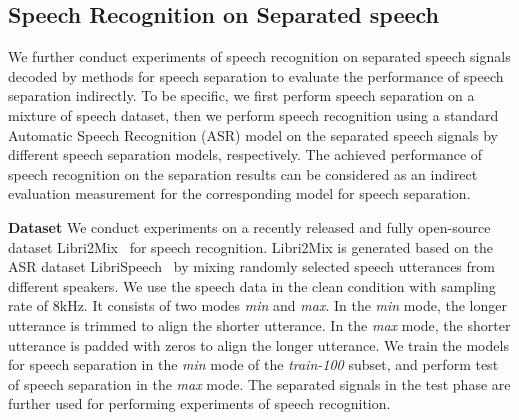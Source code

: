 \begin{table}[t]
  \centering
  \caption{Performance of speech recognition as well as speech separation on Libri2Mix dataset.}
  \label{tab:comparison_libri}
\renewcommand{\arraystretch}{1.4}
\end{table}

\subsection{Speech Recognition on Separated speech}

We further conduct experiments of speech recognition on separated speech signals decoded by methods for speech separation to evaluate the performance of speech separation indirectly.  To be specific, we first perform speech separation on a mixture of speech dataset, then we perform speech recognition using a standard Automatic Speech Recognition (ASR) model on the separated speech signals by different speech separation models, respectively. The achieved performance of speech recognition on the separation results can be considered as an indirect evaluation measurement for the corresponding model for speech separation.

\noindent\textbf{Dataset} 
We conduct experiments on a recently released and fully open-source dataset Libri2Mix~\cite{librimix} for speech recognition. Libri2Mix is generated based on the ASR dataset LibriSpeech~\cite{librispeech} by mixing randomly selected speech utterances from different speakers. 
We use the speech data in the clean condition with sampling rate of 8kHz. It consists of two modes \textit{min} and \textit{max}. In the \textit{min} mode, the longer utterance is trimmed to align the shorter utterance. In the \textit{max} mode, the shorter utterance is padded with zeros to align the longer utterance. We train the models for speech separation in the \textit{min} mode of the \textit{train-100} subset, and perform test of speech separation in the \textit{max} mode. The separated signals in the test phase are further used for performing experiments of speech recognition.

